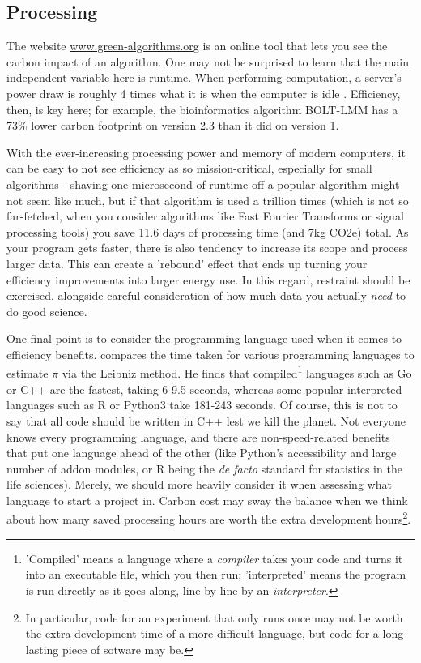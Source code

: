 \documentclass{article}
\begin{document}
\subsection{Processing}
The website \href{www.green-algorithms.org}{www.green-algorithms.org} \citep{lannelongue2021green} is an online tool that lets you see the carbon impact of an algorithm. One may not be surprised to learn that the main independent variable here is runtime. When performing computation, a server's power draw is roughly 4 times what it is when the computer is idle \citep{lannelongue2021ten}. Efficiency, then, is key here; for example, the bioinformatics algorithm BOLT-LMM has a 73\% lower carbon footprint on version 2.3 than it did on version 1.  \citep{grealey2021carbon} \newline

With the ever-increasing processing power and memory of modern computers, it can be easy to not see efficiency as so mission-critical, especially for small algorithms - shaving one microsecond of runtime off a popular algorithm might not seem like much, but if that algorithm is used a trillion times (which is not so far-fetched, when you consider algorithms like Fast Fourier Transforms or signal processing tools) you save 11.6 days of processing time (and 7kg CO2e) total.  As your program gets faster, there is also tendency to increase its scope and process larger data. This can create a 'rebound' effect \citep{lannelongue2021ten} that ends up turning your efficiency improvements into larger energy use. In this regard, restraint should be exercised, alongside careful consideration of how much data you actually \emph{need} to do good science.\newline

One final point is to consider the programming language used when it comes to efficiency benefits. \citet{heer2018speed} compares the time taken for various programming languages to estimate $\pi$ via the Leibniz method. He finds that compiled\footnote{'Compiled' means a language where a \emph{compiler} takes your code and turns it into an executable file, which you then run; 'interpreted' means the program is run directly as it goes along, line-by-line by an \emph{interpreter}.} languages such as Go or C++ are the fastest, taking 6-9.5 seconds, whereas some popular interpreted languages such as R or Python3 take 181-243 seconds. Of course, this is not to say that all code should be written in C++ lest we kill the planet. Not everyone knows every programming language, and there are non-speed-related benefits that put one language ahead of the other (like Python's accessibility and large number of addon modules, or R being the \textit{de facto} standard for statistics in the life sciences). Merely, we should more heavily consider it when assessing what language to start a project in. Carbon cost may sway the balance when we think about how many saved processing hours are worth the extra development hours\footnote{In particular, code for an experiment that only runs once may not be worth the extra development time of a more difficult language, but code for a long-lasting piece of sotware may be.}. \newline
\end{document}
